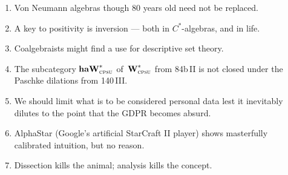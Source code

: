 \documentclass{article}
\begin{document}
\begin{enumerate}
\item
Von Neumann algebras
though 80 years old
need not be replaced.
\item
A key to positivity is inversion --- both in  $C^*$-algebras,
and in life.
\item
Coalgebraists might find a use
for  descriptive set theory.
\item
    The subcategory $\textbf{haW}^*_\text{\textsc{cpsu}}$
        of~$\textbf{W}^*_\text{\textsc{cpsu}}$ from
        \textsf{84b\,II}
        is not closed under the
         Paschke dilations from \textsf{140\,III}.

\item
We should limit what is to be considered personal data
lest it inevitably dilutes to the point
that the  GDPR becomes absurd.
\item
AlphaStar
        (Google's artificial 
        StarCraft II player)
shows masterfully calibrated
intuition, but no reason.
\item
Dissection kills the animal;
analysis kills the concept.
\end{enumerate}
\end{document}
